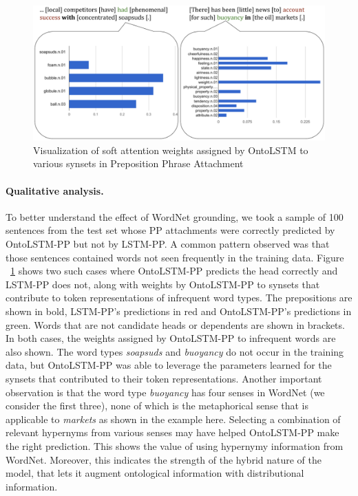 \begin{figure}
\begin{center}
\includegraphics[width=6.2in]{figures/ontolstm_relative_attention.png}
\caption{Visualization of soft attention weights assigned by OntoLSTM to various synsets in Preposition Phrase Attachment}
\label{fig:ontolstm_pp_attention_visualization}
\end{center}
\end{figure}
\paragraph{Qualitative analysis.} To better understand the effect of WordNet grounding, we took a sample of 100 sentences from the test set whose PP attachments were correctly predicted by OntoLSTM-PP but not by LSTM-PP. 
A common pattern observed was that those sentences contained words not seen frequently in the training data. Figure ~\ref{fig:ontolstm_pp_attention_visualization} shows two such cases where OntoLSTM-PP predicts the head correctly and
LSTM-PP does not, along with weights by OntoLSTM-PP to synsets that contribute to token representations of infrequent word types.
The prepositions are shown in bold, LSTM-PP's predictions in red and OntoLSTM-PP's predictions in green. Words that are not candidate heads or dependents are shown in brackets.
In both cases, the weights assigned by OntoLSTM-PP to infrequent words are also shown. The word types \textit{soapsuds} and \textit{buoyancy} 
do not occur in the training data, but OntoLSTM-PP was able to leverage the parameters learned for the synsets that contributed to their token representations.
Another important observation is that the word type \textit{buoyancy} has four senses in WordNet (we consider the first three), none of which is the metaphorical sense that is applicable to \textit{markets} as shown in the example here. Selecting a combination of relevant hypernyms from various senses may have helped OntoLSTM-PP make the right prediction. This shows the value of using hypernymy information from WordNet. Moreover, this indicates the strength of the hybrid nature of the model, that lets it augment ontological information with distributional information.

